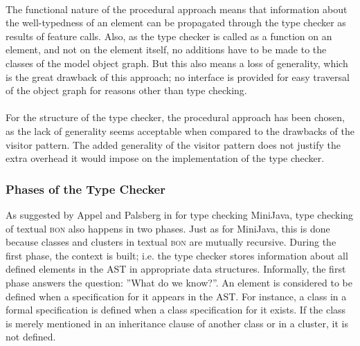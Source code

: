 \paragraph{} The functional nature of the procedural approach means that information about the well-typedness of an element can be propagated through the type checker as results of feature calls. Also, as the type checker is called as a function on an element, and not on the element itself, no additions have to be made to the classes of the model object graph. But this also means a loss of generality, which is the great drawback of this approach; no interface is provided for easy traversal of the object graph for reasons other than type checking.
\paragraph{} For the structure of the type checker, the procedural approach has been chosen, as the lack of generality seems acceptable when compared to the drawbacks of the visitor pattern. The added generality of the visitor pattern does not justify the extra overhead it would impose on the implementation of the type checker.

\subsubsection	{Phases of the Type Checker}
\label{design-phases}
As suggested by Appel and Palsberg in \cite[section~5.2]{appel2004} for type checking MiniJava, type checking of textual \textsc{bon} also happens in two phases. Just as for MiniJava, this is done because classes and clusters in textual \textsc{bon} are mutually recursive.
During the first phase, the context is built; i.e. the type checker stores information about all defined elements in the AST in appropriate data structures. Informally, the first phase answers the question: ''What do we know?''. An element is considered to be defined when a specification for it appears in the AST. For instance, a class in a formal specification is defined when a class specification for it exists. If the class is merely mentioned in an inheritance clause of another class or in a cluster, it is not defined.
